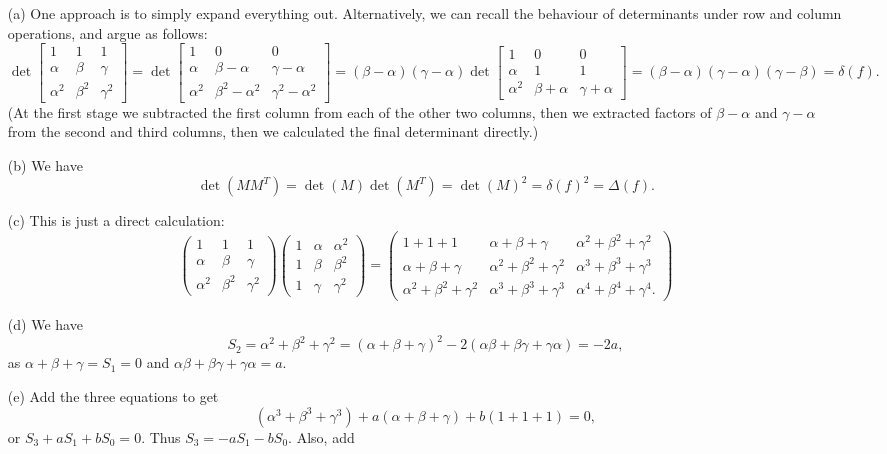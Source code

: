 \documentclass{amsart}
\newcommand{\al}        {\alpha}
\newcommand{\bt}        {\beta}
\newcommand{\gm}        {\gamma}
\newcommand{\dl}        {\delta}
\newcommand{\Dl}        {\Delta}
\newcommand{\bsm}       {\left[\begin{smallmatrix}}
\newcommand{\esm}       {\end{smallmatrix}\right]}
\renewcommand{\:}{\colon}
\newenvironment{solution}{\SolutionInline}{\endSolutionInline}
\theoremstyle{definition}
\renewenvironment{solution}{\SolutionAtEnd}{\endSolutionAtEnd}
\begin{document}
\begin{solution}
 \begin{itemize}
  \item[(a)] One approach is to simply expand everything out.
   Alternatively, we can recall the behaviour of determinants under
   row and column operations, and argue as follows:
   \[ \det\bsm 1&1&1\\ \al&\bt&\gm\\ \al^2&\bt^2&\gm^2\esm = 
      \det\bsm 1&0&0\\ \al&\bt-\al&\gm-\al\\
                \al^2&\bt^2-\al^2&\gm^2-\al^2\esm = 
      (\bt-\al)(\gm-\al)
      \det\bsm 1&0&0\\ \al&1 &1 \\
                \al^2&\bt+\al&\gm+\al\esm = 
      (\bt-\al)(\gm-\al)(\gm-\bt) = \dl(f).
   \]
   (At the first stage we subtracted the first column from each of the
   other two columns, then we extracted factors of $\bt-\al$ and
   $\gm-\al$ from the second and third columns, then we calculated the
   final determinant directly.)
  \item[(b)] We have
   \[ \det(MM^T) = \det(M)\det(M^T) = \det(M)^2 = \dl(f)^2 = \Dl(f).
   \] 
  \item[(c)] This is just a direct calculation:
   \[ \begin{pmatrix}
      1&1&1\\
      \al&\bt&\gm\\
      \al^2&\bt^2&\gm^2
     \end{pmatrix}
     \begin{pmatrix}
      1&\al&\al^2\\
      1&\bt&\bt^2\\
      1&\gm&\gm^2
     \end{pmatrix} = 
     \begin{pmatrix}
      1+1+1&\al+\bt+\gm&\al^2+\bt^2+\gm^2\\
      \al+\bt+\gm&\al^2+\bt^2+\gm^2&\al^3+\bt^3+\gm^3\\
      \al^2+\bt^2+\gm^2&\al^3+\bt^3+\gm^3&\al^4+\bt^4+\gm^4.
     \end{pmatrix}
   \] 
  \item[(d)] We have
   \[ S_2=\al^2+\bt^2+\gm^2 = 
       (\al+\bt+\gm)^2-2(\al\bt+\bt\gm+\gm\al)=-2a,
   \]
   as $\al+\bt+\gm=S_1=0$ and $\al\bt+\bt\gm+\gm\al=a$.
  \item[(e)] Add the three equations to get
   \[ (\al^3+\bt^3+\gm^3)+a(\al+\bt+\gm)+b(1+1+1)=0, \]
   or $S_3+aS_1+bS_0=0$. Thus $S_3=-aS_1-bS_0$. Also, add

\end{itemize}
\end{solution}
\end{document}
